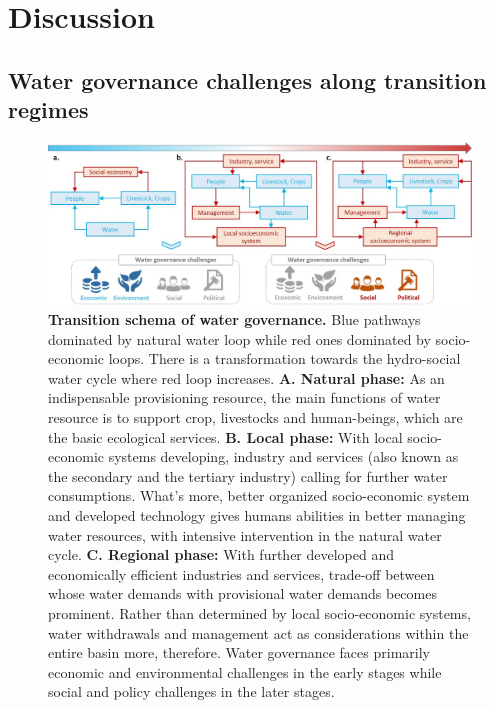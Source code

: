 \documentclass[9pt, twocolumn, twoside, lineno]{pnas-new}
\begin{document}
\section*{Discussion}
\label{Discussion}

\subsection*{Water governance challenges along transition regimes}

\begin{figure}[htbp!]
	\centering
	\includegraphics[width=\linewidth]{../../figures/main/transition.jpg}
	\caption{
		\textbf{Transition schema of water governance.} Blue pathways dominated by natural water loop while red ones dominated by socio-economic loops. There is a transformation towards the hydro-social water cycle where red loop increases.
		\textbf{A. Natural phase:} As an indispensable provisioning resource, the main functions of water resource is to support crop, livestocks and human-beings, which are the basic ecological services.
		\textbf{B. Local phase:} With local socio-economic systems developing, industry and services (also known as the secondary and the tertiary industry) calling for further water consumptions. What's more, better organized socio-economic system and developed technology gives humans abilities in better managing water resources, with intensive intervention in the natural water cycle. 
		\textbf{C. Regional phase:} With further developed and economically efficient industries and services, trade-off between whose water demands with provisional water demands becomes prominent. Rather than determined by local socio-economic systems, water withdrawals and management act as considerations within the entire basin more, therefore. 
		Water governance faces primarily economic and environmental challenges in the early stages while social and policy challenges in the later stages.
	}
	\label{fig:summary}
\end{figure}
\end{document}
